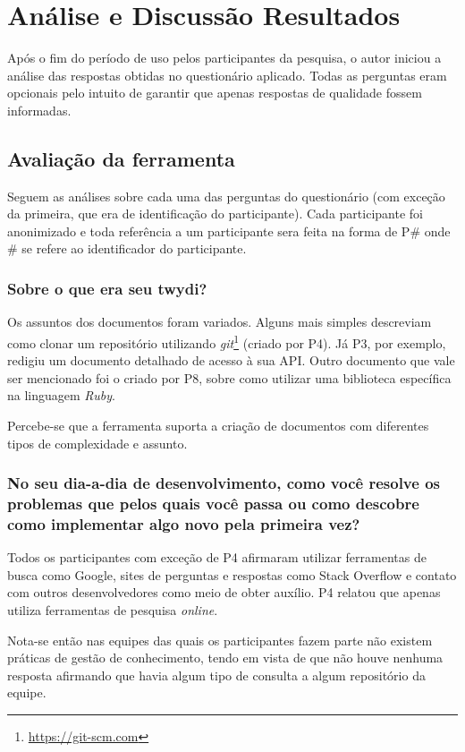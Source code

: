 \chapter{Análise e Discussão Resultados}

Após o fim do período de uso pelos participantes da pesquisa, o autor iniciou a análise das respostas obtidas no questionário aplicado. Todas as perguntas eram opcionais pelo intuito de garantir que apenas respostas de qualidade fossem informadas.

\section{Avaliação da ferramenta}

Seguem as análises sobre cada uma das perguntas do questionário (com exceção da primeira, que era de identificação do participante). Cada participante foi anonimizado e toda referência a um participante sera feita na forma de P\# onde \# se refere ao identificador do participante.

\subsection{Sobre o que era seu twydi?}

Os assuntos dos documentos foram variados. Alguns mais simples descreviam como clonar um repositório utilizando \textit{git}\footnote{\url{https://git-scm.com}} (criado por P4). Já P3, por exemplo, redigiu um documento detalhado de acesso à sua API. Outro documento que vale ser mencionado foi o criado por P8, sobre como utilizar uma biblioteca específica na linguagem \textit{Ruby}.

Percebe-se que a ferramenta suporta a criação de documentos com diferentes tipos de complexidade e assunto.

\subsection{No seu dia-a-dia de desenvolvimento, como você resolve os problemas que pelos quais você passa ou como descobre como implementar algo novo pela primeira vez?}

Todos os participantes com exceção de P4 afirmaram utilizar ferramentas de busca como Google, sites de perguntas e respostas como Stack Overflow e contato com outros desenvolvedores como meio de obter auxílio. P4 relatou que apenas utiliza ferramentas de pesquisa \textit{online}.

Nota-se então nas equipes das quais os participantes fazem parte não existem práticas de gestão de conhecimento, tendo em vista de que não houve nenhuma resposta afirmando que havia algum tipo de consulta a algum repositório da equipe.

